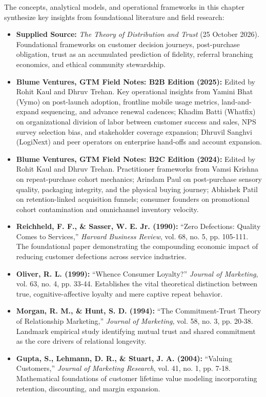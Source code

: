 The concepts, analytical models, and operational frameworks in this chapter synthesize key insights from foundational literature and field research:
\begin{itemize}[leftmargin=*]
\item \textbf{Supplied Source:} \textit{The Theory of Distribution and Trust} (25 October 2026). Foundational frameworks on customer decision journeys, post-purchase obligation, trust as an accumulated prediction of fidelity, referral branching economics, and ethical community stewardship.
\item \textbf{Blume Ventures, GTM Field Notes: B2B Edition (2025):} Edited by Rohit Kaul and Dhruv Trehan. Key operational insights from Yamini Bhat (Vymo) on post-launch adoption, frontline mobile usage metrics, land-and-expand sequencing, and advance renewal cadences; Khadim Batti (Whatfix) on organizational division of labor between customer success and sales, NPS survey selection bias, and stakeholder coverage expansion; Dhruvil Sanghvi (LogiNext) and peer operators on enterprise hand-offs and account expansion.
\item \textbf{Blume Ventures, GTM Field Notes: B2C Edition (2024):} Edited by Rohit Kaul and Dhruv Trehan. Practitioner frameworks from Vamsi Krishna on repeat-purchase cohort mechanics; Arindam Paul on post-purchase sensory quality, packaging integrity, and the physical buying journey; Abhishek Patil on retention-linked acquisition funnels; consumer founders on promotional cohort contamination and omnichannel inventory velocity.
\item \textbf{Reichheld, F. F., \& Sasser, W. E. Jr. (1990):} ``Zero Defections: Quality Comes to Services,'' \textit{Harvard Business Review}, vol. 68, no. 5, pp. 105-111. The foundational paper demonstrating the compounding economic impact of reducing customer defections across service industries.
\item \textbf{Oliver, R. L. (1999):} ``Whence Consumer Loyalty?'' \textit{Journal of Marketing}, vol. 63, no. 4, pp. 33-44. Establishes the vital theoretical distinction between true, cognitive-affective loyalty and mere captive repeat behavior.
\item \textbf{Morgan, R. M., \& Hunt, S. D. (1994):} ``The Commitment-Trust Theory of Relationship Marketing,'' \textit{Journal of Marketing}, vol. 58, no. 3, pp. 20-38. Landmark empirical study identifying mutual trust and shared commitment as the core drivers of relational longevity.
\item \textbf{Gupta, S., Lehmann, D. R., \& Stuart, J. A. (2004):} ``Valuing Customers,'' \textit{Journal of Marketing Research}, vol. 41, no. 1, pp. 7-18. Mathematical foundations of customer lifetime value modeling incorporating retention, discounting, and margin expansion.

\end{itemize}
